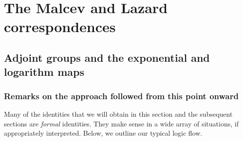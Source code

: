 \documentclass{ucetd}
\begin{document}


\chapter{The Malcev and Lazard correspondences}

\section{Adjoint groups and the exponential and logarithm maps}\label{sec:adjoint-exp-log}

\subsection*{Remarks on the approach followed from this point onward}

Many of the identities that we will obtain in this section and the
subsequent sections are {\em formal} identities. They make sense in a
wide array of situations, if appropriately interpreted. Below, we
outline our typical logic flow.
\end{document}
